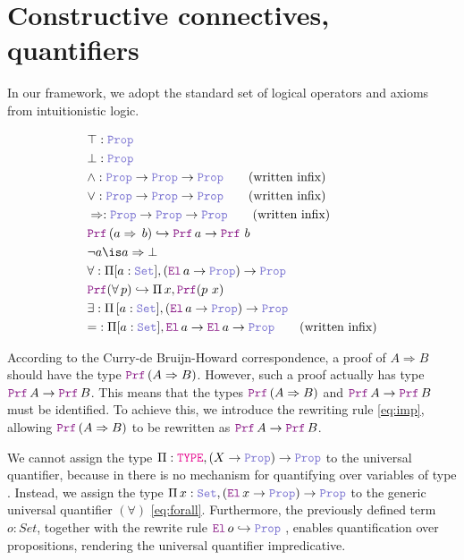 \section{Constructive connectives, quantifiers}
\label{ssec:encoding-prop}

In our framework, we adopt the standard set of logical operators and axioms from intuitionistic logic.

\begin{definition}
\begin{align}
& \top : \prop \\
& \bot : \prop \\
& \land : \prop \ra \prop \ra \prop \qquad \text{(written inﬁx)} \\
& \lor : \prop \ra \prop \ra \prop \qquad \text{(written inﬁx)} \\
& \Rightarrow : \prop \ra \prop \ra \prop \qquad \text{(written inﬁx)} \\
&  \prf\,(a \Rightarrow\,b) \re \prf\, a \ra \prf\,\,b \label{eq:imp}\\
& \neg a \is a \Rightarrow \bot \\
& \forall : \Pi {[a: \set]}, (\el\, a \ra \prop) \ra \prop \label{eq:forall}\\
& \prf{}(\forall\,p) \re \Pi\, x, \prf{(p~x)}\\
& \exists : \Pi\, {[a: \set]}, (\el\, a \ra \prop) \ra \prop \\
& {=} : \Pi [a : \set], \el\, a \ra \el\, a \ra \prop \qquad \text{(written inﬁx)}
\end{align}
\end{definition}

According to the Curry-de Bruijn-Howard correspondence, a proof of $A \Rightarrow B$ should have the type $\prf\,(A \Rightarrow B)$.
However, such a proof actually has type $\prf\,A \ra \prf\,B$. This means that the types $\prf\,(A \Rightarrow B)$ and $\prf\,A \ra \prf\,B$ must be identiﬁed.
To achieve this, we introduce the rewriting rule \cref{eq:imp}, allowing $\prf\,(A \Rightarrow B)$ to be rewritten as $\prf\,A \ra \prf\,B$.

We cannot assign the type $\Pi : \type, (X \ra \prop) \ra \prop$ to the universal quantifier, because in \lpm{} there is no mechanism for quantifying over variables of type \type.
Instead, we assign the type $\Pi\,x:\set{},(\el\,x \ra \prop) \ra \prop$ to the generic universal quantiﬁer $(\forall)$ \cref{eq:forall}.
Furthermore, the previously defined term $o: Set$, together with the rewrite rule $\el\,o\index{o}  \hookrightarrow \prop$
, enables quantification over propositions, rendering the universal quantifier impredicative.

